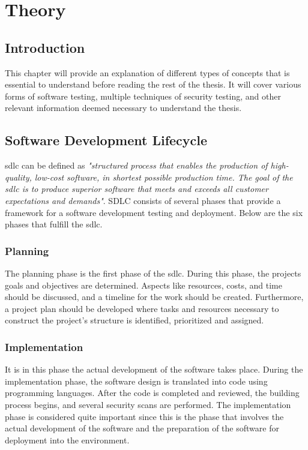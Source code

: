 \chapter{Theory}
\label{chap:Theory}

\section{Introduction}
This chapter will provide an explanation of different types of concepts that is essential to understand before reading the rest of the thesis. It will cover various forms of software testing, multiple techniques of security testing, and other relevant information deemed necessary to understand the thesis.


\section{Software Development Lifecycle}
\acrlong{sdlc} can be defined as \textit{"structured process that enables the production of high-quality, low-cost software, in shortest possible production time. The goal of the \acrshort{sdlc} is to produce superior software that meets and exceeds all customer expectations and demands"}\cite{sdlc1}.  SDLC consists of several phases that provide a framework for a software development testing and deployment. Below are the six phases that fulfill the \acrshort{sdlc}. 

  \subsection{Planning} 
 The planning phase is the first phase of the \acrshort{sdlc}. During this phase, the projects goals and objectives are determined. Aspects like resources, costs, and time should be discussed, and a timeline for the work should be created.  Furthermore, a project plan should be developed where tasks and resources necessary to construct the project's structure is identified, prioritized and assigned. \cite{planningphase}
 
 \subsection{Implementation}
 It is in this phase the actual development of the software takes place. During the implementation phase, the software design is translated into code using programming languages. After the code is completed and reviewed, the building process begins, and several security scans are performed.
 The implementation phase is considered quite important since this is the phase that involves the actual development of the software and the preparation of the software for deployment into the environment.  \cite{ImplementationSDLC}
 
